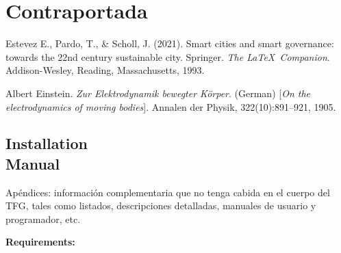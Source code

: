 \documentclass[12pt, a4paper, twoside]{article}
\begin{document}
\section{Contraportada}
\begin{thebibliography}{9}
  Estevez E., Pardo, T., \& Scholl, J. (2021).
Smart cities and smart governance: towards the 22nd century sustainable city. Springer.
    \textit{The \LaTeX\ Companion}. 
    Addison-Wesley, Reading, Massachusetts, 1993.
    
    Albert Einstein. 
    \textit{Zur Elektrodynamik bewegter K{\"o}rper}. (German) 
    [\textit{On the electrodynamics of moving bodies}]. 
    Annalen der Physik, 322(10):891–921, 1905.

\end{thebibliography}

\newpage

\begin{umaappendices}
\section{Installation \\ Manual}
Apéndices: información complementaria que no tenga cabida en el cuerpo del TFG, tales como listados, descripciones detalladas, manuales de usuario y programador, etc. 
    
    \textbf{\large{Requirements:}}
    
    \blindtext

\end{umaappendices}
\end{document}
